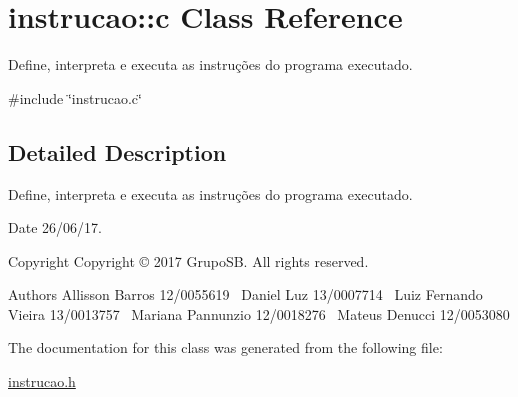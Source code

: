 \hypertarget{classinstrucao_1_1c}{}\section{instrucao\+:\+:c Class Reference}
\label{classinstrucao_1_1c}


Define, interpreta e executa as instruções do programa executado.  




{\ttfamily \#include \char`\"{}instrucao.\+c\char`\"{}}



\subsection{Detailed Description}
Define, interpreta e executa as instruções do programa executado. 

\begin{DoxyDate}{Date}
26/06/17. 
\end{DoxyDate}
\begin{DoxyCopyright}{Copyright}
Copyright © 2017 Grupo\+SB. All rights reserved.
\end{DoxyCopyright}
\begin{DoxyAuthor}{Authors}
Allisson Barros 12/0055619~\newline
Daniel Luz 13/0007714~\newline
Luiz Fernando Vieira 13/0013757~\newline
Mariana Pannunzio 12/0018276~\newline
Mateus Denucci 12/0053080 
\end{DoxyAuthor}


The documentation for this class was generated from the following file\+:\begin{DoxyCompactItemize}
\item 
\hyperlink{instrucao_8h}{instrucao.\+h}\end{DoxyCompactItemize}

